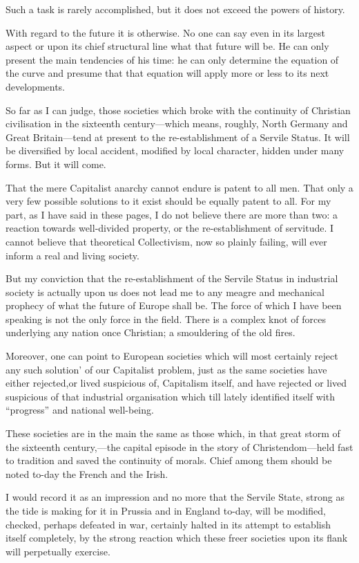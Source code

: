 \documentclass{book}
\begin{document}
Such a task is rarely accomplished, but it does not exceed the powers of history.

With regard to the future it is otherwise. No one can say even in its largest aspect or upon its chief structural line what that future will be. He can only present the main tendencies of his time: he can only determine the equation of the curve and presume that that equation will apply more or less to its next developments.

So far as I can judge, those societies which broke with the continuity of Christian civilisation in the sixteenth century—which means, roughly, North Germany and Great Britain—tend at present to the re-establishment of a Servile Status. It will be diversified by local accident, modified by local character, hidden under many forms. But it will come.

That the mere Capitalist anarchy cannot endure is patent to all men. That only a very few possible solutions to it exist should be equally patent to all. For my part, as I have said in these pages, I do not believe there are more than two: a reaction towards well-divided property, or the re-establishment of servitude. I cannot believe that theoretical Collectivism, now so plainly failing, will ever inform a real and living society.

But my conviction that the re-establishment of the Servile Status in industrial society is actually upon us does not lead me to any meagre and mechanical prophecy of what the future of Europe shall be. The force of which I have been speaking is not the only force in the field. There is a complex knot of forces underlying any nation once Christian; a smouldering of the old fires.

Moreover, one can point to European societies which will most certainly reject any such solution’ of our Capitalist problem, just as the same societies have either rejected,or lived suspicious of, Capitalism itself, and have rejected or lived suspicious of that industrial organisation which till lately identified itself with “progress” and national well-being.

These societies are in the main the same as those which, in that great storm of the sixteenth century,—the capital episode in the story of Christendom—held fast to tradition and saved the continuity of morals. Chief among them should be noted to-day the French and the Irish.

I would record it as an impression and no more that the Servile State, strong as the tide is making for it in Prussia and in England to-day, will be modified, checked, perhaps defeated in war, certainly halted in its attempt to establish itself completely, by the strong reaction which these freer societies upon its flank will perpetually exercise.
\end{document}
